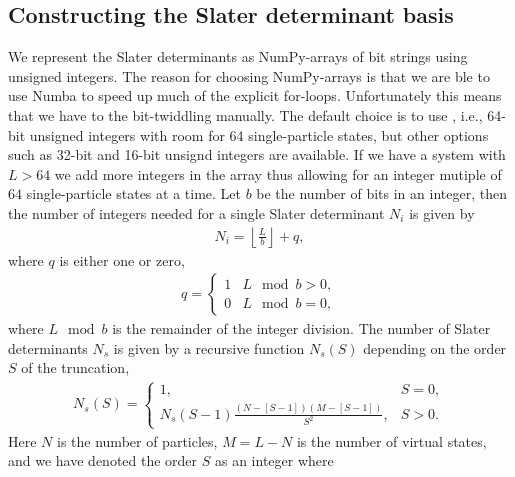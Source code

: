         \subsection{Constructing the Slater determinant basis}
            We represent the Slater determinants as NumPy-arrays \cite{numpy} of
            bit strings using unsigned integers.
            The reason for choosing NumPy-arrays is that we are ble to use Numba
            \cite{numba} to speed up much of the explicit for-loops.
            Unfortunately this means that we have to the bit-twiddling manually.
            The default choice is to use , i.e., 64-bit unsigned
            integers with room for 64 single-particle states, but other options
            such as 32-bit and 16-bit unsignd integers are available.
            If we have a system with $L > 64$ we add more integers in the array
            thus allowing for an integer mutiple of $64$ single-particle states at
            a time.
            Let $b$ be the number of bits in an integer, then the number of
            integers needed for a single Slater determinant $N_i$ is given by
            \begin{align}
                N_i = \left\lfloor\frac{L}{b}\right\rfloor
                + q,
            \end{align}
            where $q$ is either one or zero,
            \begin{align}
                q = \begin{cases}
                    1 & L \mod b > 0, \\
                    0 & L \mod b = 0,
                \end{cases}
            \end{align}
            where $L \mod b$ is the remainder of the integer division.
            The number of Slater determinants $N_s$ is given by a recursive
            function $N_s(S)$ depending on the order $S$ of the truncation,
            \begin{align}
                N_s(S) = \begin{cases}
                    1, & S = 0, \\
                    N_s(S - 1) \frac{(N - [S - 1])(M - [S - 1])}{S^2}, & S > 0.
                \end{cases}
            \end{align}
            Here $N$ is the number of particles, $M = L - N$ is the number of
            virtual states, and we have denoted the order $S$ as an integer where
